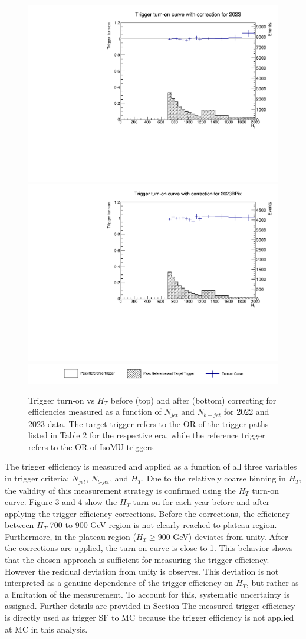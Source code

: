 \documentclass[twoside]{article}
\begin{document}
\begin{figure}[!t]
    \includegraphics[width=.24\columnwidth]{plots/Trigger/turnOn_2023_Coron.pdf}
    \includegraphics[width=.24\columnwidth]{plots/Trigger/turnOn_2023BPix_Coron.pdf}
    \includegraphics[width=.88\columnwidth]{plots/Trigger/Legend.png}

    \caption{Trigger turn-on vs $H_T$ before (top) and after (bottom) correcting for efficiencies measured as a function of $N_{jet}$ and $N_{b-jet}$ for 2022 and 2023 data. The target trigger refers to the OR of the trigger paths listed in Table 2 for the respective era, while the reference trigger refers to the OR of IsoMU triggers}
\end{figure}

The trigger efficiency is measured and applied as a function of all three variables in trigger criteria: $N_{jet}$, $N_{b\text{-}jet}$, and $H_T$. Due to the relatively coarse binning in $H_T$, the validity of this measurement strategy is confirmed using the $H_T$ turn-on curve. Figure 3 and 4 show the $H_T$ turn-on for each year before and after applying the trigger efficiency corrections. Before the corrections, the efficiency between $H_T$ 700 to 900 GeV region is not clearly reached to plateau region. Furthermore, in the plateau region ($H_T \geq 900$ GeV) deviates from unity. After the corrections are applied, the turn-on curve is close to 1. This behavior shows that the chosen approach is sufficient for measuring the trigger efficiency. However the residual deviation from unity is observes. This deviation is not interpreted as a genuine dependence of the trigger efficiency on $H_T$, but rather as a limitation of the measurement. To account for this, systematic uncertainty is assigned. Further details are provided in Section
 The measured trigger efficiency is directly used as trigger SF to MC because the trigger efficiency is not applied at MC in this analysis.\\
\end{document}
